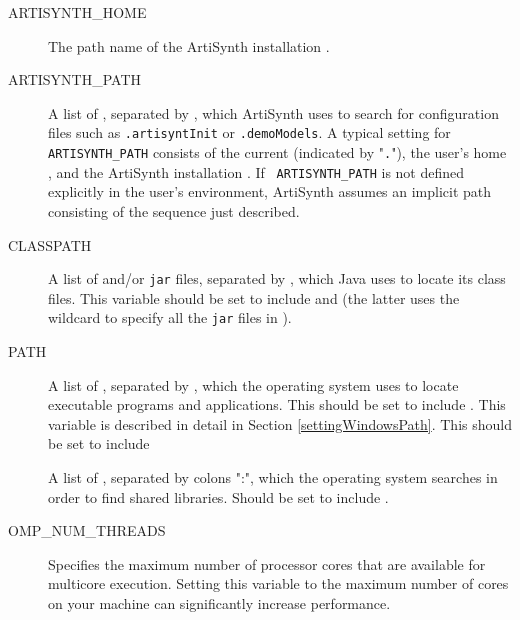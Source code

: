 \begin{description}

\item[ARTISYNTH\_HOME]\mbox{}
 
The path name of the ArtiSynth installation \directory{}.

\item[ARTISYNTH\_PATH]\mbox{}

A list of \directories{}, separated by \separatorDesc, which ArtiSynth
uses to search for configuration files such as {\tt .artisyntInit} or
{\tt .demoModels}.  A typical setting for {\tt ARTISYNTH\_PATH}
consists of the current \directory{} (indicated by "{\tt .}"), the user's
home \directory{}, and the ArtiSynth installation \directory{}. If {\tt
ARTISYNTH\_PATH} is not defined explicitly in the user's environment,
ArtiSynth assumes an implicit path consisting of the \directory{}
sequence just described.

\item[CLASSPATH]\mbox{}

A list of \directories{} and/or {\tt jar} files, separated by
\separatorDesc, which Java uses to locate its class files. This
variable should be set to include 
and  (the latter uses the
wildcard {\tt *} to specify all the {\tt jar} files in 
).

\item[PATH]\mbox{}
 
A list of \directories{}, separated by \separatorDesc, which the
operating system uses to locate executable programs and
applications. 
\ifWindows
This should be set to include .
This variable is described in detail in Section \ref{settingWindowsPath}.
\else
This should be set to include 
\fi

\ifNeedLibraryPath
\ifWindows\else
\item[\LIBRARYPATH{}]\mbox{}

A list of \directories{}, separated by colons
":", which the operating system searches in order to find shared libraries.
Should be set to include .
\fi
\fi

\item[OMP\_NUM\_THREADS]\mbox{}
 
Specifies the maximum number of processor cores that are available for
multicore execution. Setting this variable to the maximum number of
cores on your machine can significantly increase performance.

\end{description}


